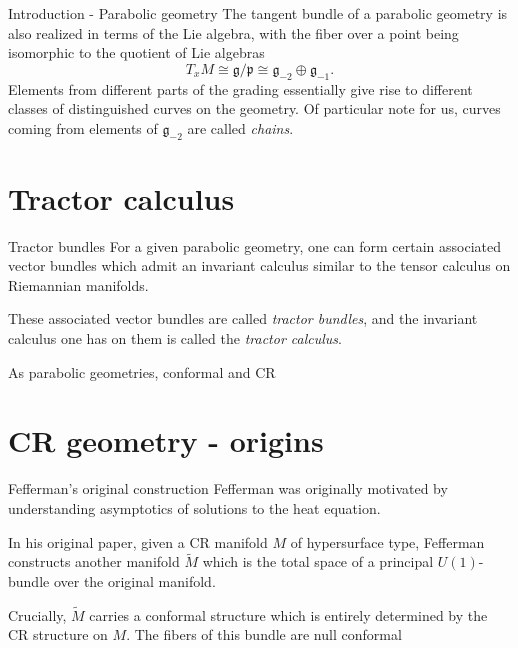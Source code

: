 \documentclass[handout]{beamer}
\begin{document}
\begin{frame}{Introduction - Parabolic geometry}
  The tangent bundle of a parabolic geometry is also realized in terms of
  the Lie algebra, with the fiber over a point being isomorphic to the quotient
  of Lie algebras 
  \[
    T_x M \cong \mathfrak{g} / \mathfrak{p} \cong
    \mathfrak{g}_{-2} \oplus \mathfrak{g}_{-1}.
  \]
  Elements from different parts of the grading essentially give rise to
  different classes of distinguished curves on the geometry.
  Of particular note for us, curves coming from elements of $\mathfrak{g}_{-2}$
  are called \emph{chains}.
\end{frame}

\section{Tractor calculus}

\begin{frame}{Tractor bundles}
  For a given parabolic geometry, one can form certain associated vector bundles
  which admit an invariant calculus similar to the tensor calculus on Riemannian manifolds.
  \pause

  These associated vector bundles are called \emph{tractor bundles}, and the
  invariant calculus one has on them is called the \emph{tractor calculus}.

  As parabolic geometries, conformal and CR 

\end{frame}

\section{CR geometry - origins}

\begin{frame}{Fefferman's original construction}
  Fefferman was originally motivated by understanding asymptotics of
  solutions to the heat equation.

  In his original paper, given a CR manifold $M$ of hypersurface type, Fefferman
  constructs another manifold $\tilde{M}$ which is the total space of a principal
  $U(1)$-bundle over the original manifold.

  Crucially, $\tilde{M}$ carries a conformal structure which is entirely
  determined by the CR structure on $M$.
  The fibers of this bundle are null conformal 
\end{frame}
\end{document}
